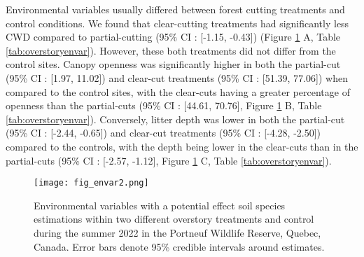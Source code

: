 Environmental variables usually differed between forest cutting treatments and control conditions. 
We found that clear-cutting treatments had significantly less CWD compared to partial-cutting (95\% CI : [-1.15, -0.43]) (Figure \ref{fig:envar} A, Table \ref{tab:overstoryenvar}). 
However, these both treatments did not differ from the control sites. 
Canopy openness was significantly higher in both the partial-cut (95\% CI : [1.97, 11.02]) and clear-cut treatments (95\% CI : [51.39, 77.06]) when compared 
to the control sites, with the clear-cuts having a greater percentage of openness than the partial-cuts (95\% CI : [44.61, 70.76], Figure \ref{fig:envar} B, Table \ref{tab:overstoryenvar}). 
Conversely, litter depth was lower in both the partial-cut (95\% CI : [-2.44, -0.65]) and clear-cut treatments (95\% CI : [-4.28, -2.50]) compared to the controls, 
with the depth being lower in the clear-cuts than in the partial-cuts (95\% CI : [-2.57, -1.12], Figure \ref{fig:envar} C, Table \ref{tab:overstoryenvar}).

\vspace{10pt}

\begin{figure}[ht]
  \centering
  \texttt{[image: fig\_envar2.png]}
  \caption[Environmental variables estimations with a potential effect soil species within two different overstory treatments and control.]
  {Environmental variables with a potential effect soil species estimations within two different overstory treatments and control 
  during the summer 2022 in the Portneuf Wildlife Reserve, Quebec, Canada. Error bars denote 95\% credible intervals around estimates.}
  \label{fig:envar}
\end{figure}

